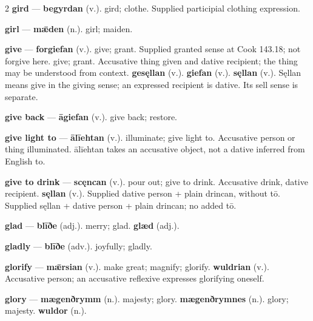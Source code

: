 \begin{multicols}{2}
\textbf{gird} — \textbf{begyrdan} (v.). gird; clothe. Supplied participial clothing expression.\par
\textbf{girl} — \textbf{mǣden} (n.). girl; maiden.\par
\textbf{give} — \textbf{forgiefan} (v.). give; grant. Supplied granted sense at Cook 143.18; not forgive here. give; grant. Accusative thing given and dative recipient; the thing may be understood from context. \textbf{gesęllan} (v.).  \textbf{giefan} (v.).  \textbf{sęllan} (v.). Sęllan means give in the giving sense; an expressed recipient is dative. Its sell sense is separate.\par
\textbf{give back} — \textbf{āgiefan} (v.). give back; restore.\par
\textbf{give light to} — \textbf{ālīehtan} (v.). illuminate; give light to. Accusative person or thing illuminated. ālīehtan takes an accusative object, not a dative inferred from English to.\par
\textbf{give to drink} — \textbf{scęncan} (v.). pour out; give to drink. Accusative drink, dative recipient. \textbf{sęllan} (v.). Supplied dative person + plain drincan, without tō. Supplied sęllan + dative person + plain drincan; no added tō.\par
\textbf{glad} — \textbf{blīðe} (adj.). merry; glad. \textbf{glæd} (adj.).\par
\textbf{gladly} — \textbf{blīðe} (adv.). joyfully; gladly.\par
\textbf{glorify} — \textbf{mǣrsian} (v.). make great; magnify; glorify. \textbf{wuldrian} (v.). Accusative person; an accusative reflexive expresses glorifying oneself.\par
\textbf{glory} — \textbf{mægenðrymm} (n.). majesty; glory. \textbf{mægenðrymnes} (n.). glory; majesty. \textbf{wuldor} (n.).\par

\end{multicols}
